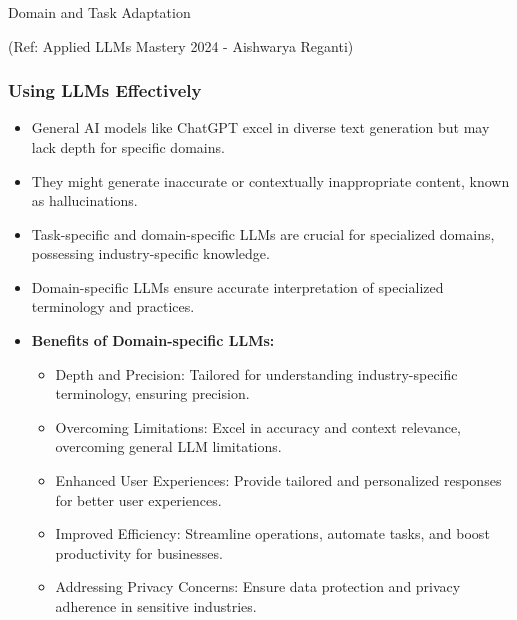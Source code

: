 \begin{frame}[fragile]\frametitle{}
\begin{center}
{\Large Domain and Task Adaptation}

{\tiny (Ref: Applied LLMs Mastery 2024 - Aishwarya Reganti)}

\end{center}


\end{frame}

\begin{frame}[fragile]\frametitle{Using LLMs Effectively}
  \begin{itemize}
    \item General AI models like ChatGPT excel in diverse text generation but may lack depth for specific domains.
    \item They might generate inaccurate or contextually inappropriate content, known as hallucinations.
    \item Task-specific and domain-specific LLMs are crucial for specialized domains, possessing industry-specific knowledge.
    \item Domain-specific LLMs ensure accurate interpretation of specialized terminology and practices.
    \item \textbf{Benefits of Domain-specific LLMs:}
      \begin{itemize}
        \item Depth and Precision: Tailored for understanding industry-specific terminology, ensuring precision.
        \item Overcoming Limitations: Excel in accuracy and context relevance, overcoming general LLM limitations.
        \item Enhanced User Experiences: Provide tailored and personalized responses for better user experiences.
        \item Improved Efficiency: Streamline operations, automate tasks, and boost productivity for businesses.
        \item Addressing Privacy Concerns: Ensure data protection and privacy adherence in sensitive industries.
      \end{itemize}
  \end{itemize}
\end{frame}

